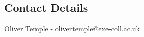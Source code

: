 \documentclass[a1,portrait]{a1poster}
\begin{document}
\begin{multicols}{2}
\color{Black} %







\section*{Contact Details}
Oliver Temple - olivertemple@exe-coll.ac.uk
\end{multicols}
\end{document}
